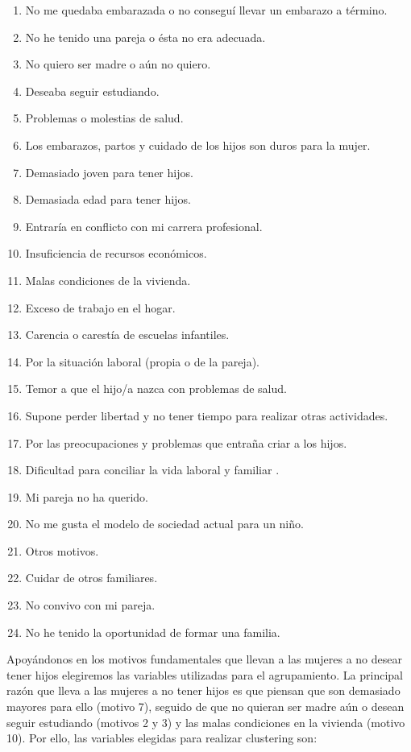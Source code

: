 \documentclass[a4paper, 20pt]{article}
\begin{document}
\begin{enumerate}
\addtocounter{enumi}{-1}
\item No me quedaba embarazada o no conseguí llevar un embarazo a término.
\item No he tenido una pareja o ésta no era adecuada.
\item No quiero ser madre o aún no quiero.
\item Deseaba seguir estudiando.
\item Problemas o molestias de salud.
\item Los embarazos, partos y cuidado de los hijos son duros para la mujer.
\item Demasiado joven para tener hijos.
\item Demasiada edad para tener hijos.
\item Entraría en conflicto con mi carrera profesional.
\item Insuficiencia de recursos económicos.
\item Malas condiciones de la vivienda.
\item Exceso de trabajo en el hogar.
\item Carencia o carestía de escuelas infantiles.
\item Por la situación laboral (propia o de la pareja).
\item Temor a que el hijo/a nazca con problemas de salud.
\item Supone perder libertad y no tener tiempo para realizar otras  actividades.
\item Por las preocupaciones y problemas que entraña criar a los hijos.
\item Dificultad para conciliar la vida laboral y familiar .
\item Mi pareja no ha querido.
\item No me gusta el modelo de sociedad actual para un niño.
\item Otros motivos.
\item Cuidar de otros familiares.
\item No convivo con mi pareja.
\item No he tenido la oportunidad de formar una familia.
\end{enumerate}

Apoyándonos en los motivos fundamentales que llevan a las mujeres a no desear tener hijos elegiremos las variables utilizadas para el agrupamiento. La principal razón que lleva a las mujeres a no tener hijos es que piensan que son demasiado mayores para ello (motivo 7), seguido de que no quieran ser madre aún o desean seguir estudiando (motivos 2 y 3) y las malas condiciones en la vivienda (motivo 10). Por ello, las variables elegidas para realizar clustering son:
\end{document}
